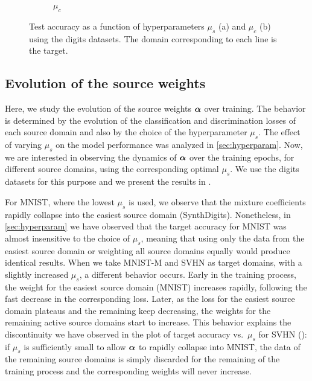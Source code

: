 \begin{figure}
\begin{subfigure}[b]{0.45\textwidth}
		\caption{$\mu_c$}
		\label{fig:hyperparam_mu_c}
	\end{subfigure}
	\caption{Test accuracy as a function of hyperparameters $\mu_s$ (a) and $\mu_c$ (b) using the digits datasets. The domain corresponding to each line is the target.}
	\label{fig:hyperparam}
\end{figure}

\subsection{Evolution of the source weights}
\label{sec:alpha_evol}
Here, we study the evolution of the source weights ${\bm{\alpha}}$ over training. The behavior is determined by the evolution of the classification and discrimination losses of each source domain and also by the choice of the hyperparameter $\mu_s$. The effect of varying $\mu_s$ on the model performance was analyzed in \ref{sec:hyperparam}. Now, we are interested in observing the dynamics of ${\bm{\alpha}}$ over the training epochs, for different source domains, using the corresponding optimal $\mu_s$. We use the digits datasets for this purpose and we present the results in .

For MNIST, where the lowest $\mu_s$ is used, we observe that the mixture coefficients rapidly collapse into the easiest source domain (SynthDigits). Nonetheless, in \ref{sec:hyperparam} we have observed that the target accuracy for MNIST was almost insensitive to the choice of $\mu_s$, meaning that using only the data from the easiest source domain or weighting all source domains equally would produce identical results. When we take MNIST-M and SVHN as target domains, with a slightly increased $\mu_s$, a different behavior occurs. Early in the training process, the weight for the easiest source domain (MNIST) increases rapidly, following the fast decrease in the corresponding loss. Later, as the loss for the easiest source domain plateaus and the remaining keep decreasing, the  weights for the remaining active source domains start to increase. This behavior explains the discontinuity we have observed in the plot of target accuracy vs.\ $\mu_s$ for SVHN (): if $\mu_s$ is sufficiently small to allow ${\bm{\alpha}}$ to rapidly collapse into MNIST, the data of the remaining source domains is simply discarded for the remaining of the training process and the corresponding weights will never increase.

